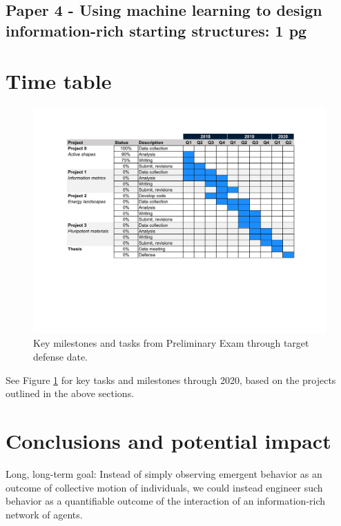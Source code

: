 \documentclass[12pt, oneside]{article}   	%
\begin{document}





\subsection{Paper 4 - Using machine learning to design information-rich starting structures: 1 pg}


\section{Time table}

\begin{figure}[t]
\begin{center}
\includegraphics[width=6.5in]{../figures/gantt.pdf}
\caption{Key milestones and tasks from Preliminary Exam through target defense date.}
\label{fig:gantt}
\end{center}
\end{figure}

See Figure \ref{fig:gantt} for key tasks and milestones through 2020, based on the projects outlined in the above sections.

\section{Conclusions and potential impact}
Long, long-term goal: Instead of simply observing emergent behavior as an outcome of collective motion of individuals, we could instead engineer such behavior as a quantifiable outcome of the interaction of an information-rich network of agents.


\newpage


\end{document}
